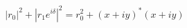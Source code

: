 \documentclass[preview]{standalone}
\begin{document}
\begin{align*}
|r_0|^2 + |r_1 e^{i\delta}|^2 = r_0^2 + (x + iy)^*(x + iy)
\end{align*}
\end{document}
